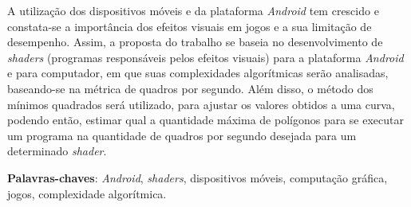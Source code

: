 \begin{resumo}

 A utilização dos dispositivos móveis e da plataforma \textit{Android} tem crescido e constata-se a importância dos efeitos visuais em jogos e a sua limitação de desempenho. Assim, a proposta do trabalho se baseia no desenvolvimento de \textit{shaders} (programas responsáveis pelos efeitos visuais) para a plataforma \textit{Android} e para computador, em que suas complexidades algorítmicas serão analisadas, baseando-se na métrica de quadros por segundo. Além disso, o método dos mínimos quadrados será utilizado, para ajustar os valores obtidos a uma curva, podendo então, estimar qual a quantidade máxima de polígonos para se executar um programa na quantidade de quadros por segundo desejada para um determinado \textit{shader}. 

 \vspace{\onelineskip}
    
 \noindent
 \textbf{Palavras-chaves}: \textit{Android}, \textit{shaders}, dispositivos móveis, computação gráfica, jogos, complexidade algorítmica. 
\end{resumo}
